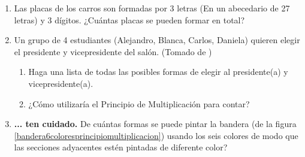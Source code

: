 \begin{enumerate}
	\item Las placas de los carros son formadas por 3 letras (En un abecedario de 27 letras) y 3 dígitos. ¿Cuántas placas se pueden formar en total?
	\item Un grupo de 4 estudiantes (Alejandro, Blanca, Carlos, Daniela) quieren elegir el presidente y vicepresidente del salón. (Tomado de \cite{Contagem_e_probabilidade})
	\begin{enumerate}
		\item Haga una lista de todas las posibles formas de elegir al presidente(a) y vicepresidente(a). 
		\item ¿Cómo utilizaría el Principio de Multiplicación para contar?
	\end{enumerate} 
	\item \textbf{... ten cuidado.} \label{Problema_bandera_6colores} De cuántas formas se puede pintar la bandera (de la figura \ref{bandera6coloresprincipiomultiplicacion}) usando los seis colores de modo que las secciones adyacentes estén pintadas de diferente color?
	

\end{enumerate}
